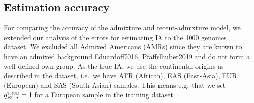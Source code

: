 \documentclass[12pt]{article}
\theoremstyle{definition}
\newcommand\crule[3][black]{\textcolor{#1}{\rule{#2}{#3}}}
\begin{document}


\subsection{Estimation accuracy}
For comparing the accuracy of the admixture and recent-admixture
model, we extended our analysis of the errors for estimating IA to the
1000 genomes dataset. We excluded all Admixed Americans (AMRs) since
they are known to have an admixed background
\cite{article}{Eduardoff2016, Pfaffelhuber2019} and do not form a
well-defined own group. As the true IA, we use the continental origins
as described in the dataset, i.e.\ we have AFR (African), EAS
(East-Asia), EUR (European) and SAS (South Asian) samples. This means
e.g.\ that we set $q^{\text{\sc true}}_{\text{EUR}}=1$ for a European
sample in the training dataset.
\end{document}
